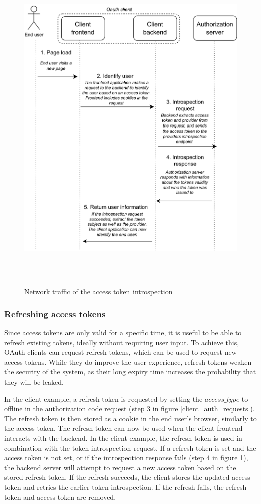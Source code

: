\begin{figure}[b]
	\centering
    \includegraphics[height=165mm]{assets/introspection_client_flow.drawio.pdf}
	\caption{Network traffic of the access token introspection}
	\label{introspection_client_flow}
\end{figure}

\subsubsection{Refreshing access tokens}
Since access tokens are only valid for a specific time, it is useful to be able to refresh existing tokens, ideally without requiring user input.
To achieve this, OAuth clients can request refresh tokens, which can be used to request new access tokens.
While they do improve the user experience, refresh tokens weaken the security of the system, as their long expiry time increases the probability that they will be leaked.

In the client example, a refresh token is requested by setting the $access\_type$ to offline in the authorization code request (step 3 in figure \ref{client_auth_requests}).
The refresh token is then stored as a cookie in the end user's browser, similarly to the access token.
The refresh token can now be used when the client frontend interacts with the backend.
In the client example, the refresh token is used in combination with the token introspection request.
If a refresh token is set and the access token is not set, or if the introspection response fails (step 4 in figure \ref{introspection_client_flow}), the backend server will attempt to request a new access token based on the stored refresh token.
If the refresh succeeds, the client stores the updated access token and retries the earlier token introspection.
If the refresh fails, the refresh token and access token are removed.
